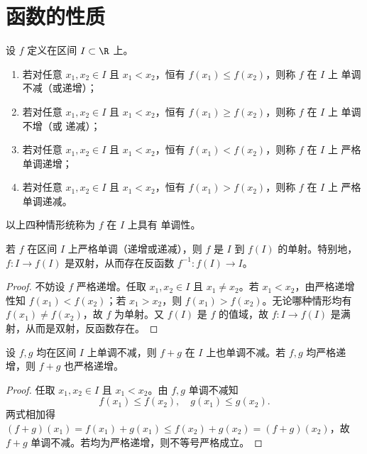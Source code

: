 \section{函数的性质}

\begin{definition}
	设 $f$ 定义在区间 $I \subset \R$ 上。
	\begin{enumerate}
		\item 若对任意 $x_1, x_2 \in I$ 且 $x_1 < x_2$，恒有 $f(x_1) \leqslant f(x_2)$，则称 $f$ 在 $I$ 上 {单调不减}（或{递增}）；
		\item 若对任意 $x_1, x_2 \in I$ 且 $x_1 < x_2$，恒有 $f(x_1) \geqslant f(x_2)$，则称 $f$ 在 $I$ 上 {单调不增}（或 {递减}）；
		\item 若对任意 $x_1, x_2 \in I$ 且 $x_1 < x_2$，恒有 $f(x_1) < f(x_2)$，则称 $f$ 在 $I$ 上 {严格单调递增}；
		\item 若对任意 $x_1, x_2 \in I$ 且 $x_1 < x_2$，恒有 $f(x_1) > f(x_2)$，则称 $f$ 在 $I$ 上 {严格单调递减}。
	\end{enumerate}
	以上四种情形统称为 $f$ 在 $I$ 上具有 {单调性}。
\end{definition}

\begin{proposition}
	若 $f$ 在区间 $I$ 上严格单调（递增或递减），则 $f$ 是 $I$ 到 $f(I)$ 的单射。特别地，$f: I \to f(I)$ 是双射，从而存在反函数 $f^{-1}: f(I) \to I$。
\end{proposition}

\begin{proof}
	不妨设 $f$ 严格递增。任取 $x_1, x_2 \in I$ 且 $x_1 \neq x_2$。若 $x_1 < x_2$，由严格递增性知 $f(x_1) < f(x_2)$；若 $x_1 > x_2$，则 $f(x_1) > f(x_2)$。无论哪种情形均有 $f(x_1) \neq f(x_2)$，故 $f$ 为单射。又 $f(I)$ 是 $f$ 的值域，故 $f: I \to f(I)$ 是满射，从而是双射，反函数存在。
\end{proof}

\begin{proposition}
	设 $f, g$ 均在区间 $I$ 上单调不减，则 $f + g$ 在 $I$ 上也单调不减。若 $f, g$ 均严格递增，则 $f + g$ 也严格递增。
\end{proposition}

\begin{proof}
	任取 $x_1, x_2 \in I$ 且 $x_1 < x_2$。由 $f, g$ 单调不减知
	\[
	f(x_1) \leqslant f(x_2), \quad g(x_1) \leqslant g(x_2).
	\]
	两式相加得 $(f+g)(x_1) = f(x_1) + g(x_1) \leqslant f(x_2) + g(x_2) = (f+g)(x_2)$，故 $f+g$ 单调不减。若均为严格递增，则不等号严格成立。
\end{proof}

